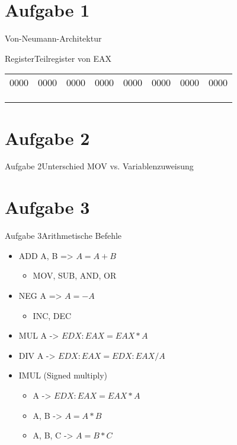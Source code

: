 \documentclass[
  german,            %
  aspectratio=169,    %
  sectionpage=false,   %
]{tumbeamer}
\begin{document}
\section{Aufgabe 1}
\begin{frame}{Von-Neumann-Architektur}
	
\end{frame}
\begin{frame}[fragile]{Register}{Teilregister von EAX}
\begin{table}[]
	\begin{tabular}{llllllll}
		0000 & 0000 & 0000 & \multicolumn{1}{l|}{0000} & 0000 & 0000 & 0000 & 0000 \\
		&  &  &  &  &  &  &  \\
		&  &  & \multicolumn{1}{l|}{} &  &  &  &  \\
		&  &  & \multicolumn{1}{l|}{} &  & \multicolumn{1}{l|}{} &  & 
	\end{tabular}
\end{table}
\end{frame}
\section{Aufgabe 2}
\begin{frame}{Aufgabe 2}{Unterschied MOV vs. Variablenzuweisung}
\end{frame}
\section{Aufgabe 3}
\begin{frame}{Aufgabe 3}{Arithmetische Befehle}
	\begin{itemize}
		\item ADD A, B => $A = A + B$
		\begin{itemize}
			\item MOV, SUB, AND, OR
		\end{itemize}
		\item NEG A => $A = -A$
		\begin{itemize}
			\item INC, DEC
		\end{itemize}
		\item MUL A -> $EDX:EAX = EAX * A$
		\item DIV A -> $EDX:EAX = EDX:EAX / A$
		\item IMUL (Signed multiply)
		\begin{itemize}
			\item A -> $EDX:EAX = EAX * A$
			\item A, B -> $A = A * B$
			\item A, B, C -> $A = B * C$
		\end{itemize}
	\end{itemize}
\end{frame}
\end{document}
